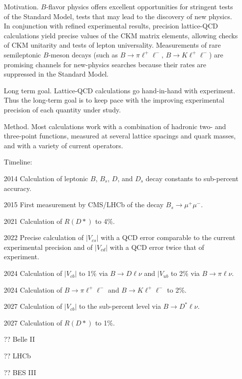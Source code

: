 \documentclass[12pt]{article}
\begin{document}
\begin{itemize}
    \item[Motivation.] $B$-flavor physics offers excellent opportunities for stringent tests of the Standard Model, tests that may lead to the discovery of new physics. In conjunction with refined experimental results, precision lattice-QCD calculations yield precise values of the CKM matrix elements, allowing checks of CKM unitarity and tests of lepton universality. Measurements of rare semileptonic $B$-meson decays (such as $B\to\pi\ell^+\ell^-$, $B\to K\ell^+\ell^-$) are promising channels for new-physics searches because their rates are suppressed in the Standard Model.
    \item[Long term goal.] Lattice-QCD calculations go hand-in-hand with experiment.  Thus the long-term goal is to keep pace with the improving experimental precision of each quantity under study.
    \item[Method.] Most calculations work with a combination of hadronic two- and three-point functions, measured at several lattice spacings and quark masses, and with a variety of current operators. 
\item[Timeline:]
    \item[2014] Calculation of leptonic $B$, $B_s$, $D$, and $D_s$ decay constants to sub-percent accuracy.
    \item[2015] First measurement by CMS/LHCb of the decay $B_s \to \mu^+\mu^-$.
    \item[2021] Calculation of $R(D*)$ to 4\%.
    \item[2022] Precise calculation of $|V_{cs}|$ with a QCD error comparable to the current experimental precision and of $|V_{cd}|$ with a QCD error twice that of experiment.
    \item[2024] Calculation of $|V_{cb}|$ to 1\% via $B\to D\ell\nu$ and $|V_{ub}$ to 2\% via $B\to \pi\ell\nu$.
    \item[2024] Calculation of $B\to\pi \ell^+\ell^-$ and $B\to K \ell^+\ell^-$ to 2\%.
    \item[2027] Calculation of $|V_{cb}|$ to the sub-percent level via $B\to D^*\ell\nu$.
    \item[2027] Calculation of $R(D*)$ to 1\%.
    \item[??] Belle II
    \item[??] LHCb
    \item[??] BES III
\end{itemize}
\end{document}
